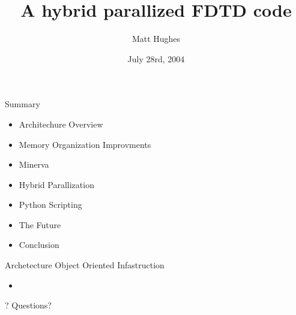 \documentclass[pdf, nototal, slideBW]{prosper}
\title{A hybrid parallized FDTD code}
\author{Matt Hughes}
\date{July 28rd, 2004}
\begin{document}
\maketitle

\begin{slide}{Summary}

  \begin{itemize}
    \item Architechure Overview 
    \item Memory Organization Improvments
    \item Minerva
    \item Hybrid Parallization
    \item Python Scripting
    \item The Future
    \item Conclusion
  \end{itemize}

\end{slide}

\begin{slide}{Archetecture}
  Object Oriented Infastruction

  \begin{itemize}
  \item 
  \end{itemize}
\end{slide}

\begin{slide}{?}
\huge
\vspace{1cm}
Questions?
\end{slide}
\end{document}
